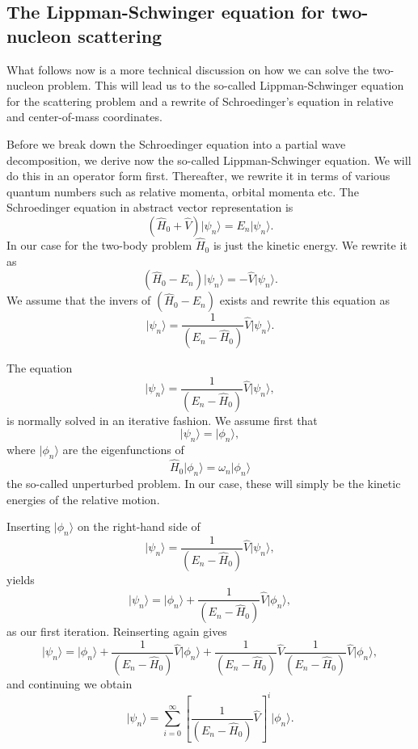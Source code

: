 \documentclass[%
oneside,                 %
final,                   %
10pt]{article}
\begin{document}
\noindent
\subsection*{The Lippman-Schwinger equation for two-nucleon scattering}

What follows now is a more technical discussion on how we can solve the two-nucleon problem.
This will lead us to the so-called Lippman-Schwinger equation for the scattering problem and a rewrite of Schroedinger's equation in relative and center-of-mass coordinates. 


Before we break down the Schroedinger equation into a partial wave decomposition, we derive now the so-called Lippman-Schwinger equation. We will do this in an operator form first.
Thereafter, we rewrite it in terms of various quantum numbers such as relative momenta, orbital momenta etc. 
The Schroedinger equation in abstract vector representation is
\[
  \left( \hat{H}_0 + \hat{V} \right) \vert \psi_n \rangle = E_n \vert\psi_n \rangle. 
\]
In our case for the two-body problem $\hat{H}_0$ is just the kinetic energy. 
We rewrite it as 
\[
\left( \hat{H}_0 -E_n \right)\vert\psi_n \rangle =-\hat{V}\vert \psi_n \rangle . 
\]
We assume that the invers of $\left( \hat{H}_0 -E_n\right)$ exists and rewrite this equation as
\[
\vert\psi_n \rangle =\frac{1}{\left( E_n -\hat{H}_0\right)}\hat{V}\vert \psi_n \rangle . 
\]

The equation
\[
\vert \psi_n \rangle =\frac{1}{\left( E_n -\hat{H}_0\right)}\hat{V}\vert \psi_n \rangle,
\]
is normally solved in an iterative fashion. 
We assume first that
\[
\vert\psi_n \rangle = \vert\phi_n \rangle,
\] 
where $\vert\phi_n \rangle$ are the eigenfunctions of 
\[
\hat{H}_0\vert \phi_n \rangle=\omega_n\vert \phi_n \rangle
\]
the so-called unperturbed problem. In our case, these will simply be the kinetic energies of the relative motion. 

Inserting  $\vert\phi_n \rangle$  on the right-hand side of 
\[
\vert \psi_n \rangle =\frac{1}{( E_n -\hat{H}_0)}\hat{V}\vert \psi_n \rangle,
\]
yields
\[
\vert \psi_n \rangle =\vert\phi_n \rangle+\frac{1}{\left( E_n -\hat{H}_0\right)}\hat{V}\vert \phi_n \rangle,
\]
as our first iteration. 
Reinserting again gives
\[
\vert \psi_n \rangle =\vert\phi_n \rangle+\frac{1}{\left( E_n -\hat{H}_0\right)}\hat{V}\vert \phi_n \rangle+\frac{1}{( E_n -\hat{H}_0)}\hat{V}\frac{1}{\left( E_n -\hat{H}_0\right)}\hat{V}\vert \phi_n \rangle,
\]
and continuing we obtain
\[
\vert \psi_n \rangle =\sum_{i=0}^{\infty}\left[\frac{1}{( E_n -\hat{H}_0)}\hat{V}\right]^i\vert \phi_n \rangle.
\]
\end{document}
